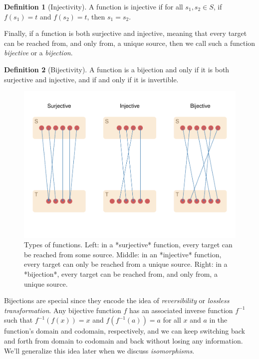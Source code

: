 \documentclass[
]{book}
\theoremstyle{definition}
\newtheorem{definition}{Definition}[chapter]
\theoremstyle{definition}
\theoremstyle{definition}
\theoremstyle{definition}
\theoremstyle{remark}
\begin{document}
\begin{definition}[Injectivity]
A function is injective if for all \(s_1, s_2 \in S\), if \(f(s_1) = t\) and \(f(s_2) = t\), then \(s_1 = s_2\).
\end{definition}

Finally, if a function is both surjective and injective, meaning that every target can be reached from, and only from, a unique source, then we call such a function \emph{bijective} or a \emph{bijection}.

\begin{definition}[Bijectivity]
A function is a bijection and only if it is both surjective and injective, and if and only if it is invertible.
\end{definition}

\begin{figure}

{\centering \includegraphics{_main_files/figure-latex/function-types-1} 

}

\caption{Types of functions. Left: in a *surjective* function, every target can be reached from some source. Middle: in an *injective* function, every target can only be reached from a unique source. Right: in a *bijection*, every target can be reached from, and only from, a unique source.}\label{fig:function-types}
\end{figure}

Bijections are special since they encode the idea of \emph{reversibility} or \emph{lossless transformation}. Any bijective function \(f\) has an associated inverse function \(f^{-1}\) such that \(f^{-1}(f(x)) = x\) and \(f(f^{-1}(a)) = a\) for all \(x\) and \(a\) in the function's domain and codomain, respectively, and we can keep switching back and forth from domain to codomain and back without losing any information. We'll generalize this idea later when we discuss \emph{isomorphisms}.
\end{document}
